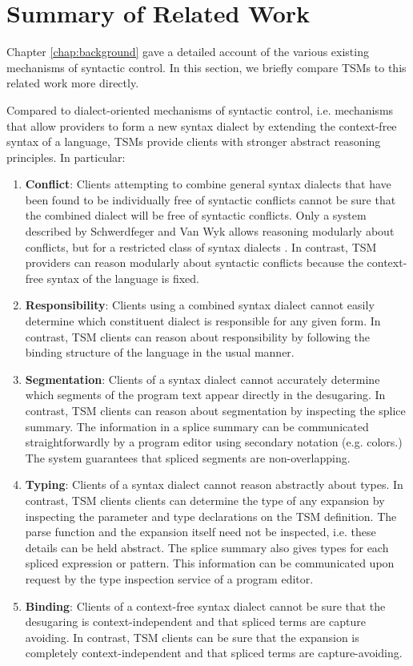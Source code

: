 \section{Summary of Related Work}
\vspace{-4px}
Chapter \ref{chap:background} gave a detailed account of the various existing mechanisms of syntactic control. In this section, we briefly compare TSMs to this related work more directly.

Compared to dialect-oriented mechanisms of syntactic control, i.e. mechanisms that allow  providers to form a new syntax dialect by extending the context-free syntax of a language, TSMs provide clients with stronger abstract reasoning principles. In particular:
\begin{enumerate}
\item \textbf{Conflict}: Clients attempting to combine general syntax dialects that have been found to be individually free of syntactic conflicts cannot  be sure that the combined dialect will be free of syntactic conflicts. Only a system described by Schwerdfeger and Van Wyk allows reasoning modularly about conflicts, but for a restricted class of syntax dialects \cite{conf/pldi/SchwerdfegerW09,schwerdfeger2010context}. In contrast, TSM providers can reason modularly about syntactic conflicts because the context-free syntax of the language is fixed.
\item \textbf{Responsibility}: Clients using a combined syntax dialect cannot easily determine which constituent dialect is responsible for any given form. In contrast, TSM clients can reason about responsibility by following the binding structure of the language in the usual manner.
\item \textbf{Segmentation}: Clients of a syntax dialect cannot accurately determine which segments of the program text appear directly in the desugaring. In contrast, TSM clients can reason about segmentation by inspecting the splice summary. The information in a splice summary can be communicated straightforwardly by a program editor using secondary notation (e.g. colors.) The system guarantees that spliced segments are non-overlapping.
\item \textbf{Typing}: Clients of a syntax dialect cannot reason abstractly about types. In contrast, TSM clients clients can determine the type of any expansion by inspecting the parameter and type declarations on the TSM definition. The parse function and the expansion itself need not be inspected, i.e. these details can be held abstract. The splice summary also gives types for each spliced expression or pattern. This information can be communicated upon request by the type inspection service of a program editor.
\item \textbf{Binding}: Clients of a context-free syntax dialect cannot be sure that the desugaring is context-independent and that spliced terms are capture avoiding. In contrast, TSM clients can be sure that the expansion is completely context-independent and that spliced terms are capture-avoiding.
\end{enumerate}

